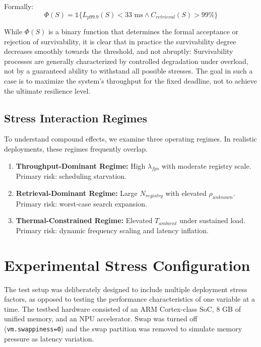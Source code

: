 \documentclass[conference]{IEEEtran}
\begin{document}
Formally:
\begin{equation}
\Phi(S) = \mathbb{1} \{ L_{p99.9}(S) < 33\text{ ms} \land C_{retrieval}(S) > 99\% \}
\end{equation}

While $\Phi(S)$ is a binary function that determines the formal acceptance or rejection of survivability, it is clear that in practice the survivability degree decreases smoothly towards the threshold, and not abruptly: Survivability processes are generally characterized by controlled degradation under overload, not by a guaranteed ability to withstand all possible stresses. The goal in such a case is to maximize the system’s throughput for the fixed deadline, not to achieve the ultimate resilience level.

\subsection{Stress Interaction Regimes}
To understand compound effects, we examine three operating regimes. In realistic deployments, these regimes frequently overlap.
\begin{enumerate}
    \item \textbf{Throughput-Dominant Regime:} High $\lambda_{fps}$ with moderate registry scale. Primary risk: scheduling starvation.
    \item \textbf{Retrieval-Dominant Regime:} Large $N_{registry}$ with elevated $\rho_{unknown}$. Primary risk: worst-case search expansion.
    \item \textbf{Thermal-Constrained Regime:} Elevated $T_{ambient}$ under sustained load. Primary risk: dynamic frequency scaling and latency inflation.
\end{enumerate}

\section{Experimental Stress Configuration}

The test setup was deliberately designed to include multiple deployment stress factors, as opposed to testing the performance characteristics of one variable at a time. The testbed hardware consisted of an ARM Cortex-class SoC, 8 GB of unified memory, and an NPU accelerator. Swap was turned off (\texttt{vm.swappiness=0}) and the swap partition was removed to simulate memory pressure as latency variation.
\end{document}
